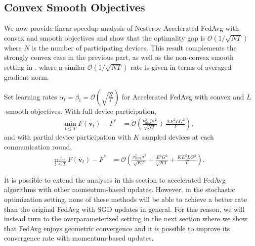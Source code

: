 \subsection{Convex Smooth Objectives}

We now provide linear speedup analysis of Nesterov Accelerated FedAvg
with convex and smooth objectives and show that the optimality gap
is $\mathcal{O}(1/\sqrt{NT})$ where $N$ is the number of participating
devices. This result complements the strongly convex case in the previous
part, as well as the non-convex smooth setting in \cite{huo2020faster,yu2019linear,li2018federated},
where a similar $\mathcal{O}(1/\sqrt{NT})$ rate is given in terms
of averaged gradient norm. 
\begin{theorem}
	\label{thm:Nesterov_cvx}Set learning rates $\alpha_{t}=\beta_{t}=\mathcal{O}(\sqrt{\frac{N}{T}})$
	for Accelerated FedAvg with convex and $L$-smooth objectives. With
	full device participation, 
	\begin{align*}
	\min_{t\leq T}F(\overline{\mathbf{v}}_{t})-F^{\ast} & =\mathcal{O}\left(\frac{\nu_{\max}^{2}\sigma^{2}}{\sqrt{NT}}+\frac{NE^{2}LG^{2}}{T}\right),
	\end{align*}
	and with partial device participation with $K$ sampled devices at
	each communication round, 
	\begin{align*}
	\min_{t\leq T}F(\overline{\mathbf{v}}_{t})-F^{\ast} & =\mathcal{O}\left(\frac{\nu_{\max}^{2}\sigma^{2}}{\sqrt{KT}}+\frac{E^{2}G^{2}}{\sqrt{KT}}+\frac{KE^{2}LG^{2}}{T}\right).
	\end{align*}
\end{theorem}
%
	It is possible to extend the analyses in this section to accelerated
    FedAvg algorithms with other momentum-based updates. However, in the
    stochastic optimization setting, none of these methods will be able
    to achieve a better rate than the original FedAvg with SGD updates in general.
    For this reason, we will instead turn to the overparameterized setting
    \cite{ma2017power,liu2018accelerating,canziani2016analysis} in the
    next section where we show that FedAvg enjoys geometric convergence
    and it is possible to improve its convergence rate with momentum-based updates.
